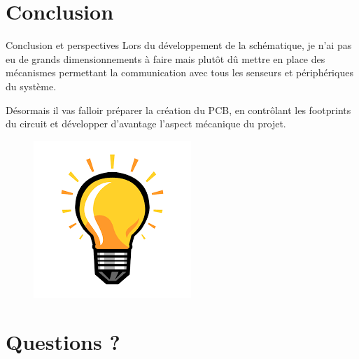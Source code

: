 \documentclass[compress,aspectratio=169]{beamer}
\begin{document}
\section{Conclusion}

\begin{frame}[containsverbatim]{Conclusion et perspectives}
	Lors du développement de la schématique, je n’ai pas eu de grands
	dimensionnements à faire mais plutôt dû mettre en place des mécanismes
	permettant la communication avec tous les senseurs et périphériques du
	système.
	
	Désormais il vas falloir préparer la création du PCB, en contrôlant les
	footprints du circuit et développer d’avantage l’aspect mécanique du projet.
	
	\begin{figure}
		\centering
		\label{fig:lightbulb}
		\includegraphics[width=0.15\linewidth]{Images/Dev-SCH/lightbulb}
	\end{figure}
	
	
\end{frame}

\section{Questions ?}
\end{document}
